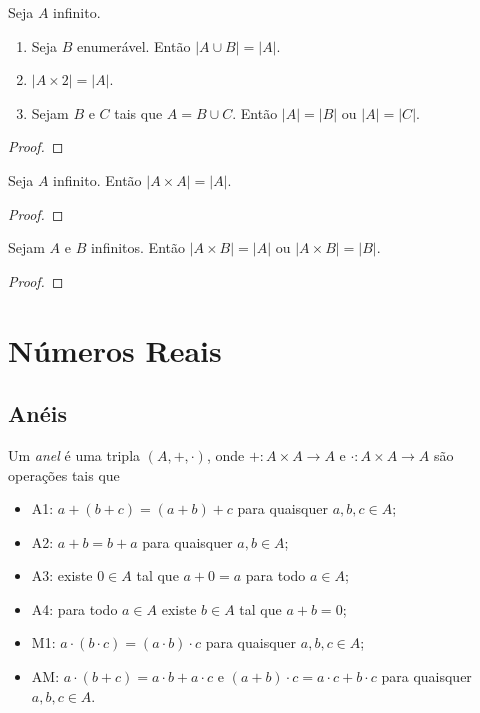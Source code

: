 \begin{lemma}
    Seja $A$ infinito.
        \begin{enumerate}[leftmargin=*, align=left, label=\textbf{(\alph*)}]
            \item Seja $B$ enumerável. Então $|A \cup B| = |A|$.
            \item $|A \times 2| = |A|$.
            \item Sejam $B$ e $C$ tais que $A = B \cup C$. Então $|A| = |B|$ ou $|A| = |C|$.
        \end{enumerate}
\end{lemma}

\begin{proof}
    \blackproof
\end{proof}

\begin{theorem}
    Seja $A$ infinito. Então $|A \times A| = |A|$.  
\end{theorem}

\begin{proof}
    \blackproof
\end{proof}

\begin{corollary}
    Sejam $A$ e $B$ infinitos. Então $|A \times B| = |A|$ ou $|A \times B| = |B|$.
\end{corollary}

\begin{proof}
    \blackproof
\end{proof}

\chapter{Números Reais}

\section{Anéis}

\begin{definition}
    Um \emph{anel} é uma tripla $(A, +, \cdot)$, onde $+:A \times A \to A$ e $\cdot: A \times A \to A$ são operações tais que
        \begin{itemize}
            \item A1: $a + (b + c) = (a + b) + c$ para quaisquer $a,b,c \in A$;
            \item A2: $a + b = b + a$ para quaisquer $a, b \in A$; 
            \item A3: existe $0 \in A$ tal que $a + 0 = a$ para todo $a \in A$;
            \item A4: para todo $a \in A$ existe $b \in A$ tal que $a + b = 0$;
            \item M1: $a \cdot (b \cdot c) = (a \cdot b) \cdot c$ para quaisquer $a,b,c \in A$;
            \item AM: $a \cdot ( b + c) = a \cdot b + a \cdot c$ e $(a+b) \cdot c = a \cdot c + b \cdot c$ para quaisquer $a,b,c \in A$.
        \end{itemize}
\end{definition}

